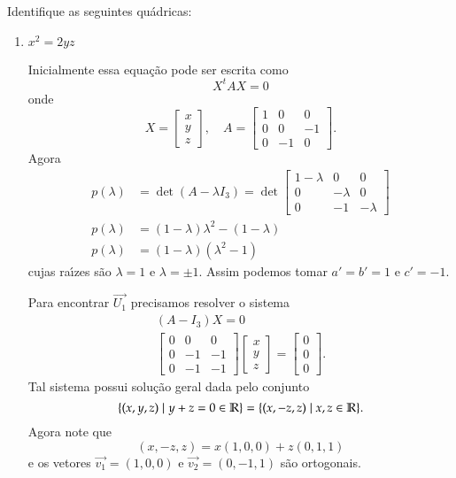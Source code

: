 \begin{exemplos}
	Identifique as seguintes qu\'adricas:
	\begin{enumerate}
		\item $x^2 = 2yz$
		\begin{solucao}
			Inicialmente essa equa\c{c}\~ao pode ser escrita como
			\[
				X^tAX = 0
			\]
			onde
			\[
				X = \begin{bmatrix}
					x\\ y\\ z
				\end{bmatrix},\quad A = \begin{bmatrix}
					1 & 0 & 0\\
					0 & 0 & -1\\
					0 & -1 & 0
				\end{bmatrix}.
			\]
			Agora
			\begin{align*}
				p(\lambda) &= \det(A - \lambda I_3) = \det \begin{bmatrix}
					1 - \lambda & 0 & 0\\
					0 & -\lambda & 0\\
					0 & -1 & -\lambda
				\end{bmatrix}\\
				p(\lambda) &= (1 - \lambda)\lambda^2 - (1 - \lambda)\\
				p(\lambda) &= (1 - \lambda)(\lambda^2 - 1)
			\end{align*}
			cujas ra{\'\i}zes s\~ao $\lambda = 1$ e $\lambda = \pm 1$. Assim podemos tomar $a' = b' = 1$ e $c' = -1$.

			Para encontrar $\vec{U_1}$ precisamos resolver o sistema
			\begin{align*}
				(A - I_3)X = 0\\
				\begin{bmatrix}
					0 & 0 & 0\\
					0 & -1 & -1\\
					0 & -1 & -1
				\end{bmatrix} \begin{bmatrix}
					x\\ y\\ z
				\end{bmatrix} = \begin{bmatrix}
					0 \\ 0\\ 0
				\end{bmatrix}.
			\end{align*}
			Tal sistema possui solu\c{c}\~ao geral dada pelo conjunto
			\[
				\{(x, y, z) \mid y + z = 0 \in \mathbb{R}\} = \{(x, -z, z) \mid x, z \in \mathbb{R}\}.
			\]
			Agora note que
			\[
				(x, -z, z) = x(1, 0, 0) + z(0, 1, 1)
			\]
			e os vetores $\vec{v_1} = (1,0,0)$ e $\vec{v_2} = (0,-1,1)$ s\~ao ortogonais.


\end{solucao}
\end{enumerate}
\end{exemplos}
